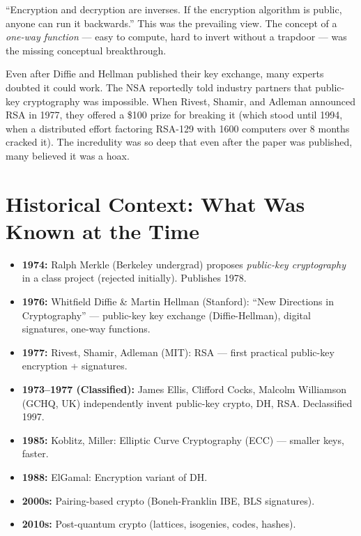``Encryption and decryption are inverses. If the encryption algorithm is public, anyone can run it backwards.'' This was the prevailing view. The concept of a \emph{one-way function} — easy to compute, hard to invert without a trapdoor — was the missing conceptual breakthrough.

Even after Diffie and Hellman published their key exchange, many experts doubted it could work. The NSA reportedly told industry partners that public-key cryptography was impossible. When Rivest, Shamir, and Adleman announced RSA in 1977, they offered a \$100 prize for breaking it (which stood until 1994, when a distributed effort factoring RSA-129 with 1600 computers over 8 months cracked it). The incredulity was so deep that even after the paper was published, many believed it was a hoax.

\section{Historical Context: What Was Known at the Time}
\label{sec:crypto:context}

\begin{itemize}
\item \textbf{1974:} Ralph Merkle (Berkeley undergrad) proposes \emph{public-key cryptography} in a class project (rejected initially). Publishes 1978.
\item \textbf{1976:} Whitfield Diffie \& Martin Hellman (Stanford): ``New Directions in Cryptography'' — public-key key exchange (Diffie-Hellman), digital signatures, one-way functions.
\item \textbf{1977:} Rivest, Shamir, Adleman (MIT): RSA — first practical public-key encryption + signatures.
\item \textbf{1973--1977 (Classified):} James Ellis, Clifford Cocks, Malcolm Williamson (GCHQ, UK) independently invent public-key crypto, DH, RSA. Declassified 1997.
\item \textbf{1985:} Koblitz, Miller: Elliptic Curve Cryptography (ECC) — smaller keys, faster.
\item \textbf{1988:} ElGamal: Encryption variant of DH.
\item \textbf{2000s:} Pairing-based crypto (Boneh-Franklin IBE, BLS signatures).
\item \textbf{2010s:} Post-quantum crypto (lattices, isogenies, codes, hashes).
\end{itemize}

